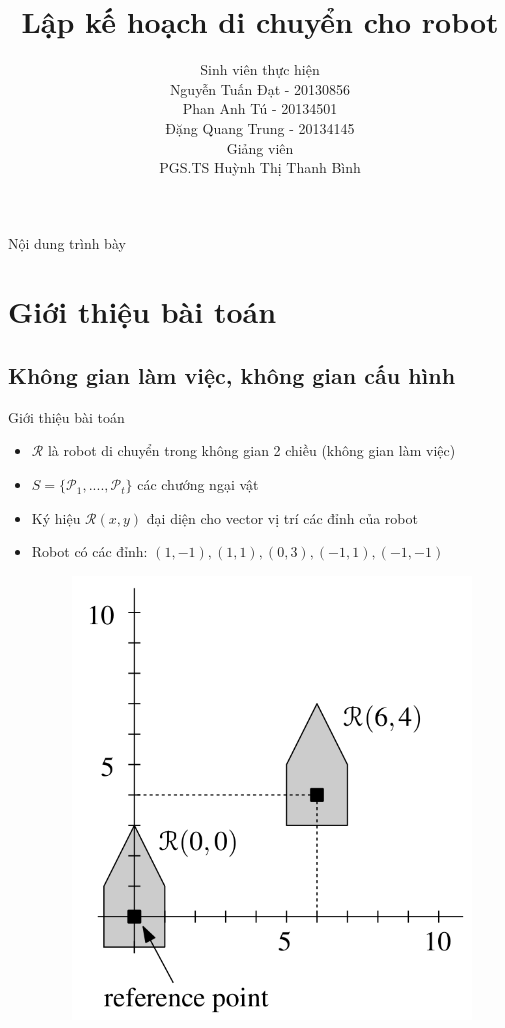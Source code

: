 \documentclass[compress]{beamer}
\title[Lập kế hoạch di chuyển cho robot]{Lập kế hoạch di chuyển cho robot}
\author[Nguyễn Tuấn Đạt, Đặng Quang Trung, Phan Anh Tú (SoICT)]{
Sinh viên thực hiện\\
Nguyễn Tuấn Đạt - 20130856 \\
Phan Anh Tú - 20134501 \\
Đặng Quang Trung - 20134145 \\[1em]
Giảng viên \\
PGS.TS Huỳnh Thị Thanh Bình}
\begin{document}
\begin{frame}[plain]
\titlepage
\end{frame}

\begin{frame}[plain]{Nội dung trình bày}
\tableofcontents
\end{frame}

\section{Giới thiệu bài toán}

\subsection{Không gian làm việc, không gian cấu hình}
\begin{frame}{Giới thiệu bài toán}
\begin{itemize}
\item $\mathcal{R}$ là robot di chuyển trong không gian 2 chiều (không gian làm việc) 
\item $S = \{\mathcal{P}_1, ...., \mathcal{P}_t\}$ các chướng ngại vật 
\item Ký hiệu $\mathcal{R}(x,y)$ đại diện cho vector vị trí các đỉnh của robot
\item Robot có các đỉnh: $(1,-1), (1,1), (0,3), (-1,1), (-1,-1)$ 
\begin{figure}[H]
\centering
\includegraphics[scale=0.2]{work_space_definition.png}
\end{figure}
\end{itemize}
\end{frame}
\end{document}
